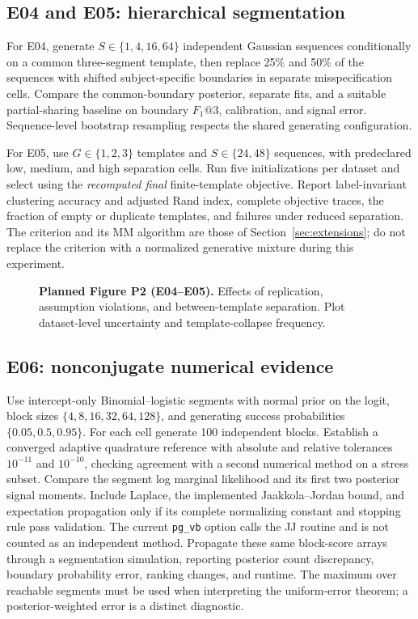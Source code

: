 \subsection{E04 and E05: hierarchical segmentation}
For E04, generate $S\in\{1,4,16,64\}$ independent Gaussian sequences
conditionally on a common three-segment template, then replace 25\% and 50\%
of the sequences with shifted subject-specific boundaries in separate
misspecification cells. Compare the common-boundary posterior, separate fits,
and a suitable partial-sharing baseline on boundary $F_1@3$, calibration, and
signal error. Sequence-level bootstrap resampling respects the shared
generating configuration.

For E05, use $G\in\{1,2,3\}$ templates and $S\in\{24,48\}$ sequences, with
predeclared low, medium, and high separation cells. Run five initializations
per dataset and select using the \emph{recomputed final} finite-template
objective. Report label-invariant clustering accuracy and adjusted Rand index,
complete objective traces, the fraction of empty or duplicate templates, and
failures under reduced separation. The criterion and its MM algorithm are
those of Section~\ref{sec:extensions}; do not replace the criterion with a
normalized generative mixture during this experiment.

\begin{figure}[!htbp]
\centering
{}
\hfill
{}
\caption{\textbf{Planned Figure P2 (E04--E05).} Effects of replication,
assumption violations, and between-template separation. Plot dataset-level
uncertainty and template-collapse frequency.}
\label{fig:planned-hierarchical-paper}
\end{figure}

\subsection{E06: nonconjugate numerical evidence}
Use intercept-only Binomial--logistic segments with normal prior on the logit,
block sizes $\{4,8,16,32,64,128\}$, and generating success probabilities
$\{0.05,0.5,0.95\}$. For each cell generate 100 independent blocks.
Establish a converged adaptive quadrature reference with absolute and relative
tolerances $10^{-11}$ and $10^{-10}$, checking agreement with a second numerical
method on a stress subset. Compare the segment log marginal likelihood and its
first two posterior signal moments. Include Laplace, the implemented
Jaakkola--Jordan bound, and expectation propagation only if its complete
normalizing constant and stopping rule pass validation. The current
\texttt{pg\_vb} option calls the JJ routine and is not counted as an
independent method. Propagate these same block-score arrays through a
segmentation simulation, reporting posterior count discrepancy, boundary
probability error, ranking changes, and runtime. The maximum over reachable
segments must be used when interpreting the uniform-error theorem; a
posterior-weighted error is a distinct diagnostic.

